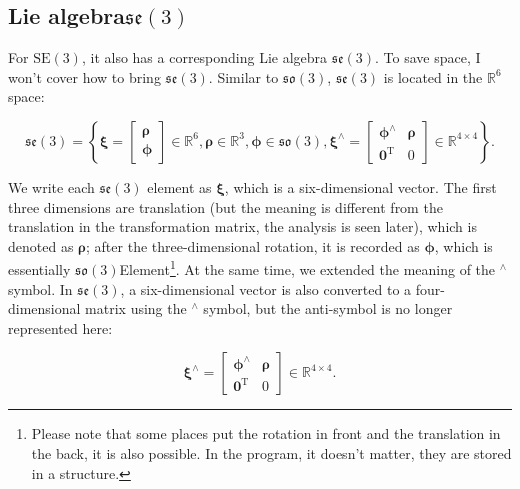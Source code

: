 \subsection{Lie algebra$\mathfrak{se}(3)$}

For $\mathrm{SE}(3)$, it also has a corresponding Lie algebra $\mathfrak{se}(3)$.
To save space, I won't cover how to bring $\mathfrak{se}(3)$.
Similar to $\mathfrak{so}(3)$, $\mathfrak{se}(3)$ is located in the $\mathbb{R}^6$ space:

\begin{equation}
\mathfrak{se}(3) = \left\{ { \boldsymbol{\xi} = \left[ \begin{array}{l}
\boldsymbol{\rho} \\
\boldsymbol{\phi}
\end{array} \right]
\in { \mathbb{R}^6} ,
\boldsymbol{\rho} \in { \mathbb{R}^3}, \boldsymbol{\phi} \in \mathfrak{so} \left( 3 \right),{ \boldsymbol{\xi} ^ \wedge } = \left[ {\begin{array}{*{20}{c}}
{{ \boldsymbol{\phi} ^ \wedge }}& \boldsymbol{\rho} \\
{{\bm{0}^\mathrm{T}}}&0
\end{array}} \right] \in { \mathbb{R}^{4 \times 4}}} \right\}.
\end{equation}

We write each $\mathfrak{se}(3)$ element as $\boldsymbol{\xi}$, which is a six-dimensional vector.
The first three dimensions are translation (but the meaning is different from the translation in the transformation matrix, the analysis is seen later), which is denoted as $\boldsymbol{\rho}$; after the three-dimensional rotation, it is recorded as $\boldsymbol{\phi}$, which is essentially $\mathfrak{so}(3)$Element\footnote{Please note that some places put the rotation in front and the translation in the back, it is also possible.
In the program, it doesn't matter, they are stored in a structure. }.
At the same time, we extended the meaning of the $^\wedge$ symbol.
In $\mathfrak{se}(3)$, a six-dimensional vector is also converted to a four-dimensional matrix using the $^\wedge$ symbol, but the anti-symbol is no longer represented here:

\begin{equation}
{ \boldsymbol{\xi} ^ \wedge } = \left[ {\begin{array}{*{20}{c}}
{{ \boldsymbol{\phi} ^ \wedge }}& \boldsymbol{\rho} \\
{{\bm{0}^\mathrm{T}}}&0
\end{array}} \right] \in { \mathbb{R}^{4 \times 4}}.
\end{equation}

